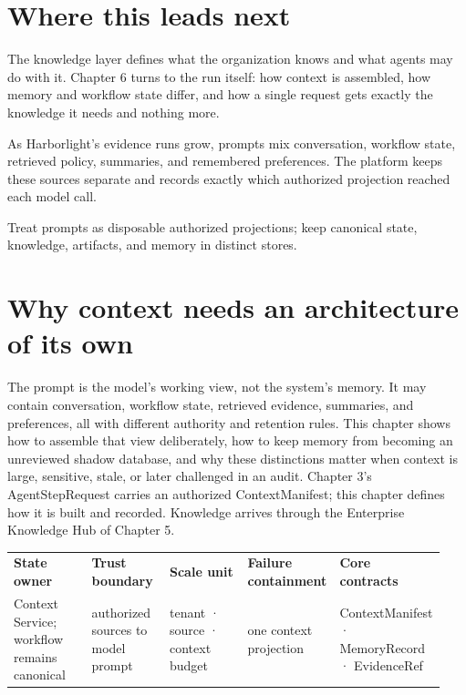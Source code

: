 \section{Where this leads next}

The knowledge layer defines what the organization knows and what agents may do with it. Chapter 6 turns to the run itself: how context is assembled, how memory and workflow state differ, and how a single request gets exactly the knowledge it needs and nothing more.\par



\begin{bookcallout}
As Harborlight's evidence runs grow, prompts mix conversation, workflow state, retrieved policy, summaries, and remembered preferences. The platform keeps these sources separate and records exactly which authorized projection reached each model call.
\end{bookcallout}

\begin{bookcallout}
Treat prompts as disposable authorized projections; keep canonical state, knowledge, artifacts, and memory in distinct stores.
\end{bookcallout}

\section{Why context needs an architecture of its own}

The prompt is the model's working view, not the system's memory. It may contain conversation, workflow state, retrieved evidence, summaries, and preferences, all with different authority and retention rules. This chapter shows how to assemble that view deliberately, how to keep memory from becoming an unreviewed shadow database, and why these distinctions matter when context is large, sensitive, stale, or later challenged in an audit. Chapter 3's AgentStepRequest carries an authorized ContextManifest; this chapter defines how it is built and recorded. Knowledge arrives through the Enterprise Knowledge Hub of Chapter 5.\par

\BookTableStart
\fontsize{7.2}{9}\selectfont
\begin{tabular}{@{}Y{0.1880\linewidth}Y{0.1880\linewidth}Y{0.1880\linewidth}Y{0.1880\linewidth}Y{0.1880\linewidth}@{}}
\color{white}\bfseries \textbf{State owner} & \color{white}\bfseries \textbf{Trust boundary} & \color{white}\bfseries \textbf{Scale unit} & \color{white}\bfseries \textbf{Failure containment} & \color{white}\bfseries \textbf{Core contracts} \\
Context Service; workflow remains canonical & authorized sources to model prompt & tenant · source · context budget & one context projection & ContextManifest · MemoryRecord · EvidenceRef \\
\end{tabular}
\BookTableEnd

